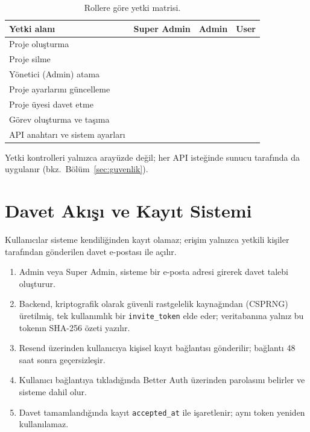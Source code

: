 \documentclass[11pt,a4paper]{article}
\newcommand{\ok}{\textcolor{okgreen}{\ding{51}}}
\newcommand{\hayir}{\textcolor{darkgray}{\ding{55}}}
\begin{document}
\begin{table}[H]
\centering
\small
\begin{tabular}{lccc}
\toprule
\textbf{Yetki alanı} & \textbf{Super Admin} & \textbf{Admin} & \textbf{User}\\
\midrule
Proje oluşturma                    & \ok    & \hayir & \hayir\\
Proje silme                        & \ok    & \hayir & \hayir\\
Yönetici (Admin) atama             & \ok    & \hayir & \hayir\\
Proje ayarlarını güncelleme        & \ok    & \ok    & \hayir\\
Proje üyesi davet etme             & \ok    & \ok    & \hayir\\
Görev oluşturma ve taşıma          & \ok    & \ok    & \ok\\
API anahtarı ve sistem ayarları    & \ok    & \hayir & \hayir\\
\bottomrule
\end{tabular}
\caption{Rollere göre yetki matrisi.}
\label{tab:rbac}
\end{table}

Yetki kontrolleri yalnızca arayüzde değil; her API isteğinde sunucu
tarafında da uygulanır (bkz.\ Bölüm~\ref{sec:guvenlik}).

\section{Davet Akışı ve Kayıt Sistemi}
\label{sec:davit}

Kullanıcılar sisteme kendiliğinden kayıt olamaz; erişim yalnızca
yetkili kişiler tarafından gönderilen davet e-postası ile açılır.

\begin{enumerate}
  \item Admin veya Super Admin, sisteme bir e-posta adresi girerek davet
  talebi oluşturur.
  \item Backend, kriptografik olarak güvenli rastgelelik kaynağından
  (CSPRNG) üretilmiş, tek kullanımlık bir \texttt{invite\_token} elde
  eder; veritabanına yalnız bu tokenın SHA-256 özeti yazılır.
  \item Resend üzerinden kullanıcıya kişisel kayıt bağlantısı gönderilir;
  bağlantı 48 saat sonra geçersizleşir.
  \item Kullanıcı bağlantıya tıkladığında Better Auth üzerinden
  parolasını belirler ve sisteme dahil olur.
  \item Davet tamamlandığında kayıt \texttt{accepted\_at} ile
  işaretlenir; aynı token yeniden kullanılamaz.
\end{enumerate}
\end{document}
